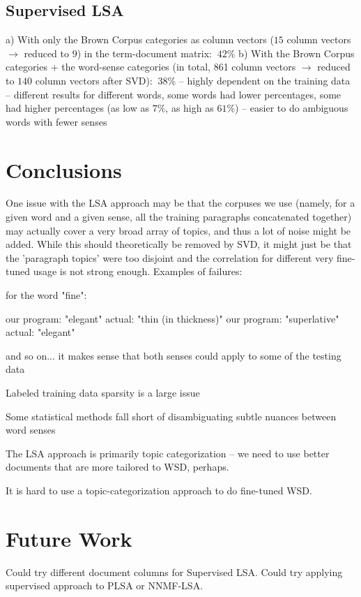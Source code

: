 \documentclass[10pt, letterpaper]{article}
\begin{document}
	\subsection{Supervised LSA}

	a) With only the Brown Corpus categories as column vectors ($15$ column vectors $\rightarrow$ reduced to $9$) in the term-document matrix: $ ~ 42\%$
	b) With the Brown Corpus categories + the word-sense categories (in total, 861 column vectors $\rightarrow$ reduced to $140$ column vectors after SVD): $ ~ 38\%$
	-- highly dependent on the training data -- different results for different words, some words had lower percentages, some had higher percentages (as low as $7\%$, as high as $61\%$)
	-- easier to do ambiguous words with fewer senses

	\section{Conclusions}
	One issue with the LSA approach may be that the corpuses we use (namely, for a given word and a given sense, all the training paragraphs concatenated together) may actually cover a very broad array of topics, and thus a lot of noise might be added. While this should theoretically be removed by SVD, it might just be that the 'paragraph topics' were too disjoint and the correlation for different very fine-tuned usage is not strong enough. 
	Examples of failures: 

	for the word "fine": 	

	our program: "elegant"  actual: "thin (in thickness)"
	our program: "superlative" actual: "elegant" 	

	and so on... it makes sense that both senses could apply to some of the testing data

	Labeled training data sparsity is a large issue

	Some statistical methods fall short of disambiguating subtle nuances between word senses	

	The LSA approach is primarily topic categorization -- we need to use better documents that are more tailored to WSD, perhaps. 	

	It is hard to use a topic-categorization approach to do fine-tuned WSD. 

	\section{Future Work}
	Could try different document columns for Supervised LSA.
	Could try applying supervised approach to PLSA or NNMF-LSA.	
\end{document}
